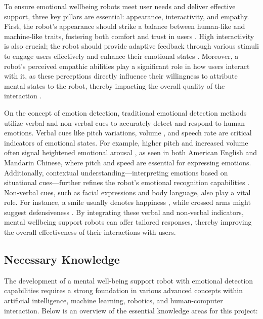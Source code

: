 To ensure emotional wellbeing robots meet user needs and deliver effective support, three key pillars are essential: appearance, interactivity, and empathy. First, the robot’s appearance should strike a balance between human-like and machine-like traits, fostering both comfort and trust in users \cite{10.1145/3640794.3665551}. High interactivity is also crucial; the robot should provide adaptive feedback through various stimuli to engage users effectively and enhance their emotional states \cite{Wang_2024}. Moreover, a robot’s perceived empathic abilities play a significant role in how users interact with it, as these perceptions directly influence their willingness to attribute mental states to the robot, thereby impacting the overall quality of the interaction \cite{lillo2024investigatingrelationshipempathyattribution}.

On the concept of emotion detection, traditional emotional detection methods utilize verbal and non-verbal cues to accurately detect and respond to human emotions. Verbal cues like pitch variations, volume \cite{HAKANPAA2021570}, and speech rate \cite{app8122629} are critical indicators of emotional states. For example, higher pitch and increased volume often signal heightened emotional arousal \cite{RODERO2011e25}, as seen in both American English and Mandarin Chinese, where pitch and speed are essential for expressing emotions. Additionally, contextual understanding—interpreting emotions based on situational cues—further refines the robot’s emotional recognition capabilities \cite{abbas2024context}. Non-verbal cues, such as facial expressions and body language, also play a vital role. For instance, a smile usually denotes happiness \cite{chapre2023emotion}, while crossed arms might suggest defensiveness \cite{liu2024emotiondetectionbodygesture}. By integrating these verbal and non-verbal indicators, mental wellbeing support robots can offer tailored responses, thereby improving the overall effectiveness of their interactions with users.

\subsection{Necessary Knowledge}

The development of a mental well-being support robot with emotional detection capabilities requires a strong foundation in various advanced concepts within artificial intelligence, machine learning, robotics, and human-computer interaction. Below is an overview of the essential knowledge areas for this project:

